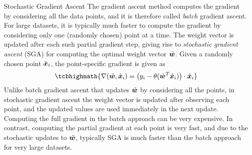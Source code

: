 \begin{frame}{Stochastic Gradient Ascent}
The gradient ascent method computes the gradient by considering all the
data points, and it is therefore called {\em batch} gradient ascent. 
For large datasets, it is typically much faster to compute
the gradient by considering only one (randomly chosen) point at a time.
The weight vector is updated after each such partial gradient step,
giving rise to {\em stochastic gradient ascent} (SGA) for computing
the optimal weight vector $\tilde{{\boldsymbol w}}$. 
%
Given a randomly chosen point $\tilde{{\boldsymbol x}}_i$, the
point-specific gradient %
is given as
\begin{align}
    \tcbhighmath{
    \grad(\abw, \abx_i) = \bigl(y_i - \theta(\abw^T\abx_i)\bigr) \cdot
\abx_i}
\end{align}
Unlike batch gradient ascent that updates $\tilde{{\boldsymbol w}}$ by considering all the
points, in stochastic gradient ascent the weight vector is updated after
observing each point, and the updated values are used immediately in the
next update. Computing the full gradient in the batch approach can be
very expensive. In contrast, computing the partial gradient at each
point is very fast, and due to the stochastic updates to $\tilde{{\boldsymbol w}}$,
typically SGA is much faster than the batch
approach for very large datasets.

\end{frame}

